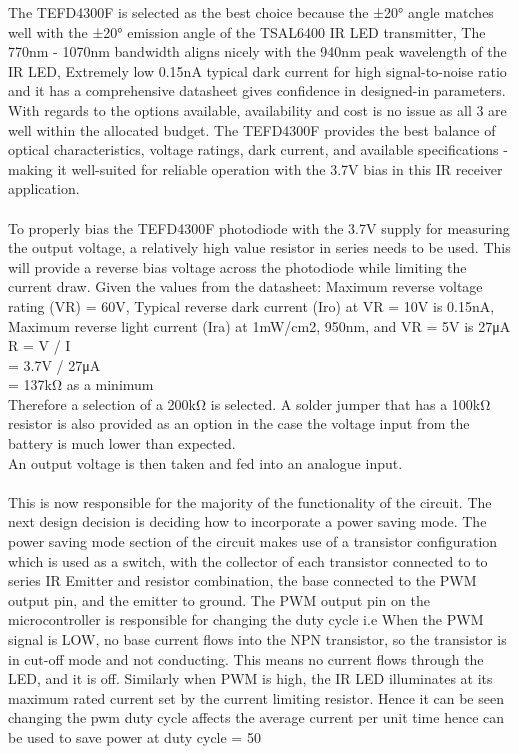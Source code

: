 \documentclass[class=report,11pt,crop=false]{standalone}
\begin{document}
  The TEFD4300F is selected as the best choice because the ±20° angle matches well with the ±20° emission angle of the TSAL6400 IR LED transmitter, The 770nm - 1070nm bandwidth aligns nicely with the 940nm peak wavelength of the IR LED, Extremely low 0.15nA typical dark current for high signal-to-noise ratio and it has a comprehensive datasheet gives confidence in designed-in parameters.\\
  With regards to the options available, availability and cost is no issue as all 3 are well within the allocated budget. The TEFD4300F provides the best balance of optical characteristics, voltage ratings, dark current, and available specifications - making it well-suited for reliable operation with the 3.7V bias in this IR receiver application. \\\\
  To properly bias the TEFD4300F photodiode with the 3.7V supply for measuring the output voltage, a relatively high value resistor in series needs to be used. This will provide a reverse bias voltage across the photodiode while limiting the current draw. Given the values from the datasheet: Maximum reverse voltage rating (VR) = 60V,
Typical reverse dark current (Iro) at VR = 10V is 0.15nA,
Maximum reverse light current (Ira) at 1mW/cm2, 950nm, and VR = 5V is 27μA\\
R = V / I \\
= 3.7V / 27μA\\
= 137kΩ as a minimum\\
Therefore a selection of a 200kΩ is selected. A solder jumper that has a 100kΩ resistor is also provided as an option in the case the voltage input from the battery is much lower than expected.
\\
An output voltage is then taken and fed into an analogue input.
\\\\
This is now responsible for the majority of the functionality of the circuit. The next design decision is deciding how to incorporate a power saving mode. The power saving mode section of the circuit makes use of a transistor configuration which is used as a switch, with the collector of each transistor connected to to series IR Emitter and resistor combination, the base connected to the PWM output pin, and the emitter to ground. The PWM output pin on the microcontroller is responsible for changing the duty cycle i.e When the PWM signal is LOW, no base current flows into the NPN transistor, so the transistor is in cut-off mode and not conducting. This means no current flows through the LED, and it is off. Similarly when PWM is high, the IR LED illuminates at its maximum rated current set by the current limiting resistor. Hence it  can be seen changing the pwm duty cycle affects the average current per unit time hence can be used to save power at duty cycle = 50%
\end{document}
